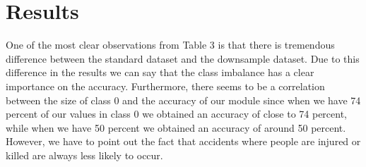 \documentclass[conference]{IEEEtran}
\begin{document}
\section{Results}
	\begin{table}[H]
		\centering
		\caption{Summary of our results with the standard dataset and the downsampled dataset}
	\end{table}
	One of the most clear observations from Table 3 is that there is tremendous difference between the standard dataset and the downsample dataset. Due to this difference in the results we can say that the class imbalance has a clear importance on the accuracy. Furthermore, there seems to be a correlation between the size of class 0 and the accuracy of our module since when we have 74 percent of our values in class 0 we obtained an accuracy of close to 74 percent, while when we have 50 percent we obtained an accuracy of around 50 percent. However, we have to point out the fact that accidents where people are injured or killed are always less likely to occur.
\end{document}
